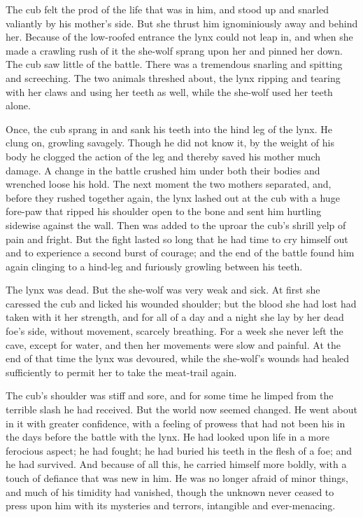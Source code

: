 \documentclass[10pt]{book}
\begin{document}
The cub felt the prod of the life that was in him, and stood up and
snarled valiantly by his mother’s side. But she thrust him
ignominiously away and behind her. Because of the low-roofed entrance
the lynx could not leap in, and when she made a crawling rush of it the
she-wolf sprang upon her and pinned her down. The cub saw little of the
battle. There was a tremendous snarling and spitting and screeching.
The two animals threshed about, the lynx ripping and tearing with her
claws and using her teeth as well, while the she-wolf used her teeth
alone.

Once, the cub sprang in and sank his teeth into the hind leg of the
lynx. He clung on, growling savagely. Though he did not know it, by the
weight of his body he clogged the action of the leg and thereby saved
his mother much damage. A change in the battle crushed him under both
their bodies and wrenched loose his hold. The next moment the two
mothers separated, and, before they rushed together again, the lynx
lashed out at the cub with a huge fore-paw that ripped his shoulder
open to the bone and sent him hurtling sidewise against the wall. Then
was added to the uproar the cub’s shrill yelp of pain and fright. But
the fight lasted so long that he had time to cry himself out and to
experience a second burst of courage; and the end of the battle found
him again clinging to a hind-leg and furiously growling between his
teeth.

The lynx was dead. But the she-wolf was very weak and sick. At first
she caressed the cub and licked his wounded shoulder; but the blood she
had lost had taken with it her strength, and for all of a day and a
night she lay by her dead foe’s side, without movement, scarcely
breathing. For a week she never left the cave, except for water, and
then her movements were slow and painful. At the end of that time the
lynx was devoured, while the she-wolf’s wounds had healed sufficiently
to permit her to take the meat-trail again.

The cub’s shoulder was stiff and sore, and for some time he limped from
the terrible slash he had received. But the world now seemed changed.
He went about in it with greater confidence, with a feeling of prowess
that had not been his in the days before the battle with the lynx. He
had looked upon life in a more ferocious aspect; he had fought; he had
buried his teeth in the flesh of a foe; and he had survived. And
because of all this, he carried himself more boldly, with a touch of
defiance that was new in him. He was no longer afraid of minor things,
and much of his timidity had vanished, though the unknown never ceased
to press upon him with its mysteries and terrors, intangible and
ever-menacing.
\end{document}
